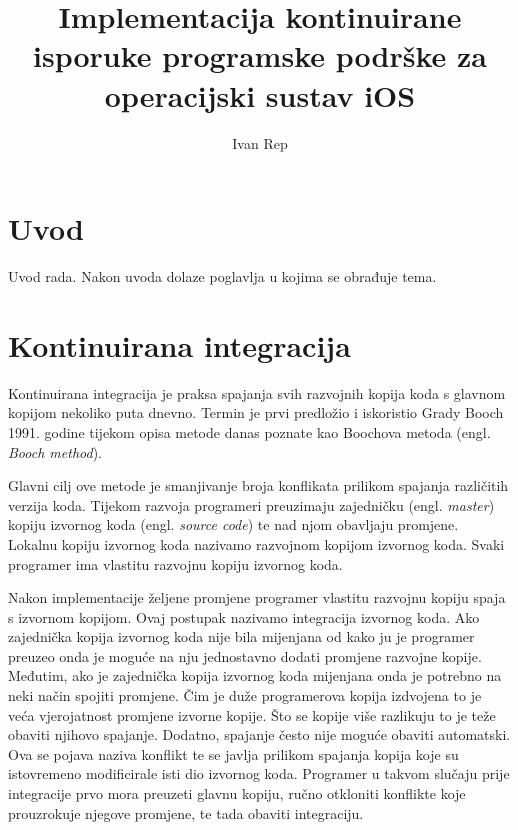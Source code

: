 \documentclass[times, utf8, diplomski, numeric]{fer}
\newcommand{\eng}[1]{(engl. \textit{#1})}
\begin{document}

\title{Implementacija kontinuirane isporuke programske podrške za operacijski sustav iOS}

\author{Ivan Rep}

\maketitle

\izvornik

\zahvala{}

\tableofcontents

\chapter{Uvod}
Uvod rada. Nakon uvoda dolaze poglavlja u kojima se obrađuje tema.

\chapter{Kontinuirana integracija}
Kontinuirana integracija je praksa spajanja svih razvojnih kopija koda s glavnom kopijom nekoliko puta dnevno. Termin je prvi predložio i iskoristio Grady Booch 1991. godine tijekom opisa metode danas poznate kao Boochova metoda \eng{Booch method}\citep{wiki:BoochMethod}.

Glavni cilj ove metode je smanjivanje broja konflikata prilikom spajanja različitih verzija koda. Tijekom razvoja programeri preuzimaju zajedničku \eng{master} kopiju izvornog koda \eng{source code} te nad njom obavljaju promjene. Lokalnu kopiju izvornog koda nazivamo razvojnom kopijom izvornog koda. Svaki programer ima vlastitu razvojnu kopiju izvornog koda.

Nakon implementacije željene promjene programer vlastitu razvojnu kopiju spaja s izvornom kopijom. Ovaj postupak nazivamo integracija izvornog koda. Ako zajednička kopija izvornog koda nije bila mijenjana od kako ju je programer preuzeo onda je moguće na nju jednostavno dodati promjene razvojne kopije. Međutim, ako je zajednička kopija izvornog koda mijenjana onda je potrebno na neki način spojiti promjene. Čim je duže programerova kopija izdvojena to je veća vjerojatnost promjene izvorne kopije. Što se kopije više razlikuju to je teže obaviti njihovo spajanje. Dodatno, spajanje često nije moguće obaviti automatski. Ova se pojava naziva konflikt te se javlja prilikom spajanja kopija koje su istovremeno modificirale isti dio izvornog koda. Programer u takvom slučaju prije integracije prvo mora preuzeti glavnu kopiju, ručno otkloniti konflikte koje prouzrokuje njegove promjene, te tada obaviti integraciju.
\end{document}
